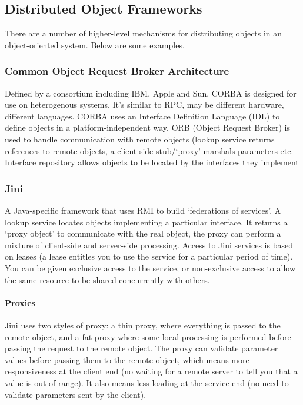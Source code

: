 \documentclass[a4paper,oneside]{report}
\begin{document}
    	\subsection{Distributed Object Frameworks}
    	There are a number of higher-level mechanisms for distributing objects in an object-oriented system. Below are some examples.
    	
      		\subsubsection{Common Object Request Broker Architecture}
      		 Defined by a consortium including IBM, Apple and Sun, CORBA is designed for use on heterogenous systems. It's similar to RPC, may be different hardware, different languages. CORBA uses an Interface Definition Language (IDL) to define objects in a platform-independent way. ORB (Object Request Broker) is used to handle communication with remote objects (lookup service returns references to remote objects, a client-side stub/`proxy' marshals parameters etc. Interface repository allows objects to be located by the interfaces they implement
      		
      		\subsubsection{Jini}
      		A Java-specific framework that uses RMI to build ‘federations of services’. A lookup service locates objects implementing a particular interface. It returns a ‘proxy object’ to communicate with the real object, the proxy can perform a mixture of client-side and server-side processing. Access to Jini services is based on leases (a lease entitles you to use the service for a particular period of time). You can be given exclusive access to the service, or non-exclusive access to allow the same resource to be shared concurrently with others.
      	 
      	 	\paragraph{Proxies}
      	 	Jini uses two styles of proxy: a thin proxy, where everything is passed to the remote object, and a fat proxy where some local processing is performed before passing the request to the remote object. The proxy can validate parameter values before passing them to the remote object, which means more responsiveness at the client end (no waiting for a remote server to tell you that a value is out of range). It also means less loading at the service end (no need to validate parameters sent by the client).\\
      	 	
\end{document}

